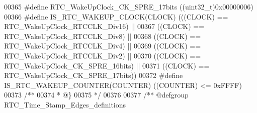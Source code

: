 \begin{DoxyCode}
00365 \textcolor{preprocessor}{#}\textcolor{preprocessor}{define} \textcolor{preprocessor}{RTC\_WakeUpClock\_CK\_SPRE\_17bits}      \textcolor{preprocessor}{(}\textcolor{preprocessor}{(}\textcolor{preprocessor}{uint32\_t}\textcolor{preprocessor}{)}0x00000006\textcolor{preprocessor}{)}
00366 \textcolor{preprocessor}{#}\textcolor{preprocessor}{define} \textcolor{preprocessor}{IS\_RTC\_WAKEUP\_CLOCK}\textcolor{preprocessor}{(}\textcolor{preprocessor}{CLOCK}\textcolor{preprocessor}{)} \textcolor{preprocessor}{(}\textcolor{preprocessor}{(}\textcolor{preprocessor}{(}\textcolor{preprocessor}{CLOCK}\textcolor{preprocessor}{)} \textcolor{preprocessor}{==} 
      RTC_WakeUpClock_RTCCLK_Div16\textcolor{preprocessor}{)} \textcolor{preprocessor}{||}
00367                                     \textcolor{preprocessor}{(}\textcolor{preprocessor}{(}\textcolor{preprocessor}{CLOCK}\textcolor{preprocessor}{)} \textcolor{preprocessor}{==} RTC_WakeUpClock_RTCCLK_Div8\textcolor{preprocessor}{)} \textcolor{preprocessor}{||}
00368                                     \textcolor{preprocessor}{(}\textcolor{preprocessor}{(}\textcolor{preprocessor}{CLOCK}\textcolor{preprocessor}{)} \textcolor{preprocessor}{==} RTC_WakeUpClock_RTCCLK_Div4\textcolor{preprocessor}{)} \textcolor{preprocessor}{||}
00369                                     \textcolor{preprocessor}{(}\textcolor{preprocessor}{(}\textcolor{preprocessor}{CLOCK}\textcolor{preprocessor}{)} \textcolor{preprocessor}{==} RTC_WakeUpClock_RTCCLK_Div2\textcolor{preprocessor}{)} \textcolor{preprocessor}{||}
00370                                     \textcolor{preprocessor}{(}\textcolor{preprocessor}{(}\textcolor{preprocessor}{CLOCK}\textcolor{preprocessor}{)} \textcolor{preprocessor}{==} 
      RTC_WakeUpClock_CK_SPRE_16bits\textcolor{preprocessor}{)} \textcolor{preprocessor}{||}
00371                                     \textcolor{preprocessor}{(}\textcolor{preprocessor}{(}\textcolor{preprocessor}{CLOCK}\textcolor{preprocessor}{)} \textcolor{preprocessor}{==} 
      RTC_WakeUpClock_CK_SPRE_17bits\textcolor{preprocessor}{)}\textcolor{preprocessor}{)}
00372 \textcolor{preprocessor}{#}\textcolor{preprocessor}{define} \textcolor{preprocessor}{IS\_RTC\_WAKEUP\_COUNTER}\textcolor{preprocessor}{(}\textcolor{preprocessor}{COUNTER}\textcolor{preprocessor}{)}  \textcolor{preprocessor}{(}\textcolor{preprocessor}{(}\textcolor{preprocessor}{COUNTER}\textcolor{preprocessor}{)} \textcolor{preprocessor}{<=} 0xFFFF\textcolor{preprocessor}{)}
00373 \textcolor{comment}{/**}
00374 \textcolor{comment}{  * @\}}
00375 \textcolor{comment}{  */}
00376 
00377 \textcolor{comment}{/** @defgroup RTC\_Time\_Stamp\_Edges\_definitions }

\end{DoxyCode}
